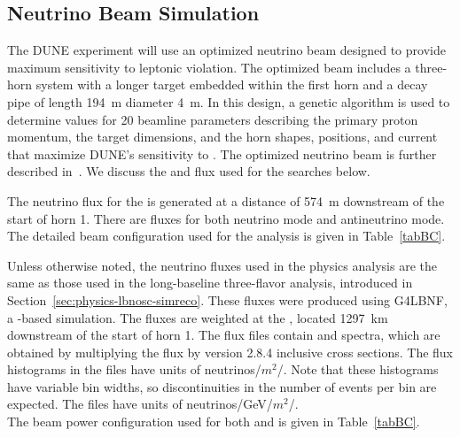 \subsection{Neutrino Beam Simulation}
\label{Nusim}
The DUNE experiment will use an optimized neutrino beam designed to provide maximum sensitivity to leptonic  violation. The optimized beam includes a three-horn system with a longer target embedded within the first horn and a decay pipe of length \SI{194}{m} diameter \SI{4}{m}.  In this design, a genetic algorithm is used to determine values for 20 beamline parameters describing the primary proton momentum, the target dimensions, and the horn shapes, positions, and current that maximize DUNE's sensitivity to . The optimized neutrino beam is further described in~\cite{Laura:2017}. We discuss the  and  flux used for the  searches below. 

The neutrino flux for the  is generated at a distance of \SI{574}{m}  downstream of the start of horn 1. There are fluxes for both neutrino mode and antineutrino mode. The detailed beam configuration used for the   analysis is given in Table~\ref{tabBC}.

Unless otherwise noted, the neutrino fluxes used in the  physics analysis are the same as those used in the long-baseline three-flavor analysis, introduced in Section~\ref{sec:physics-lbnosc-simreco}. These fluxes were produced using G4LBNF, a -based simulation.  The fluxes are weighted  at the , located \SI{1297}{km} downstream of the start of horn 1. The flux files  contain  and  spectra, which are obtained by multiplying the flux by  version 2.8.4 inclusive cross sections. The flux histograms in the  files  have units of neutrinos/$m^{2}$/. Note that these histograms have variable bin widths, so discontinuities in the number of events per bin are expected. The  files have units of neutrinos/GeV/$m^{2}$/.\\
The beam power configuration used for both  and  is given in Table~\ref{tabBC}.

